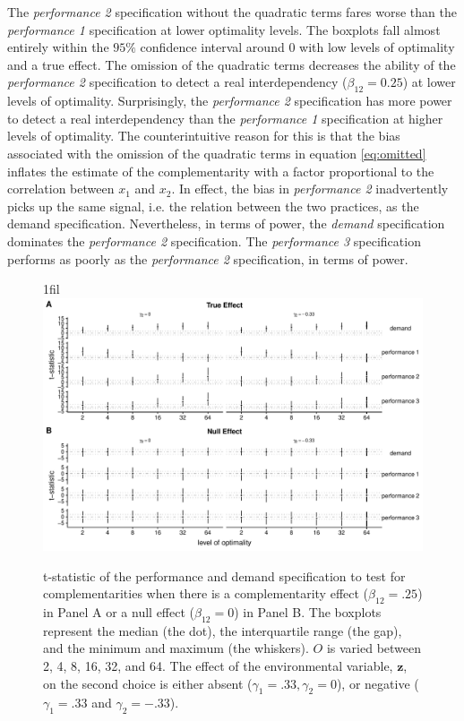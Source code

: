\documentclass[12pt]{article}
\makeatletter
\newcommand*{\centerfloat}{%
  \parindent \z@
  \leftskip \z@ \@plus 1fil \@minus \textwidth
  \rightskip\leftskip
  \parfillskip \z@skip}
\makeatother
\begin{document}
The \emph{performance 2} specification without the quadratic terms fares worse than the \emph{performance 1} specification at lower optimality levels. The boxplots fall almost entirely within the $95\%$ confidence interval around $0$ with low levels of optimality and a true effect. The omission of the quadratic terms decreases the ability of the \emph{performance 2} specification to detect a real interdependency ($\beta_{12} = 0.25$) at lower levels of optimality. Surprisingly, the \emph{performance 2} specification has more power to detect a real interdependency than the \emph{performance 1} specification at higher levels of optimality. The counterintuitive reason for this is that the bias associated with the omission of the quadratic terms in equation \ref{eq:omitted} inflates the estimate of the complementarity with a factor proportional to the correlation between $x_1$ and $x_2$. In effect, the bias in \emph{performance 2} inadvertently picks up the same signal, i.e. the relation between the two practices, as the demand specification. Nevertheless, in terms of power, the \emph{demand} specification dominates the \emph{performance 2} specification. The \emph{performance 3} specification performs as poorly as the \emph{performance 2}  specification, in terms of power. 

\begin{figure}
\centerfloat
\includegraphics[width=450px]{figure-latex/main_new_plot.pdf}
\caption[Error Rate  and Power of Demand and Performance Specification]
{\label{main} t-statistic of the performance and demand specification to test
for complementarities when there is a complementarity effect ($\beta_{12} = .25$)
in Panel A or a null effect ($\beta_{12} = 0$) in Panel B. The boxplots represent the median (the dot), the interquartile range (the gap), and the minimum and maximum (the whiskers). $O$ is varied between 2, 4, 8, 16, 32, and 64. The effect of the environmental variable, $\mathbf{z}$, on the second choice is either absent ($\gamma_1 = .33,   \gamma_2 = 0$), or negative ($\gamma_1 = .33$ and $\gamma_2 = -.33$).}
\end{figure}
\end{document}
